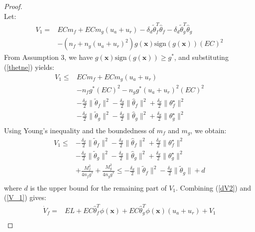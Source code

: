 \documentclass[preprint,12pt]{elsarticle}
\begin{document}
\begin{proof}
\begin{equation}
\end{equation}
Let:
\begin{equation}
    \begin{aligned}
        V_1 = &  EC m_f + EC m_g (u_a + u_r) - \delta_d \tilde{\theta}^{T}_f \hat{\theta}_f - \delta_d \tilde{\theta}^{T}_g \hat{\theta}_g \\ 
        & -(n_f+n_g(u_a + u_r)^2)g(\mathbf{x})\mathrm{sign}(g(\mathbf{x})) (EC)^2\label{V_1}
    \end{aligned}
\end{equation}
From Assumption 3, we have \(g(\mathbf{x})\mathrm{sign}(g(\mathbf{x})) \geq g^*\), and substituting (\ref*{thetne}) yields:
\begin{equation}
    \begin{aligned}
        V_1 \leq &  EC m_f + EC m_g (u_a + u_r)    \\
        & -n_f g^*(EC)^2 - n_g g^* (u_a + u_r)^2(EC)^2\\
        & - \frac{\delta_d}{2}\|\tilde{\theta}_f\|^2-\frac{\delta_d}{2}\|\hat{\theta}_f\|^2+\frac{\delta_d}{2}\|\theta^\star_f\|^2 \\ 
        & - \frac{\delta_d}{2}\|\tilde{\theta}_g\|^2-\frac{\delta_d}{2}\|\hat{\theta}_g\|^2+\frac{\delta_d}{2}\|\theta^\star_g\|^2 \\ 
    \end{aligned}
\end{equation}
Using Young's inequality and the boundedness of \(m_f\) and \(m_g\), we obtain:
\begin{equation}
    \begin{aligned}
        V_1 \leq & - \frac{\delta_d}{2}\|\tilde{\theta}_f\|^2-\frac{\delta_d}{2}\|\hat{\theta}_f\|^2+\frac{\delta_d}{2}\|\theta^\star_f\|^2 \\ 
        & - \frac{\delta_d}{2}\|\tilde{\theta}_g\|^2-\frac{\delta_d}{2}\|\hat{\theta}_g\|^2+\frac{\delta_d}{2}\|\theta^\star_g\|^2 \\ 
        & + \frac{M_f^2}{4n_fg^*} + \frac{M_g^2}{4n_gg^*} \leq - \frac{\delta_d}{2}\|\tilde{\theta}_f\|^2 - \frac{\delta_d}{2}\|\tilde{\theta}_g\| + d \\
    \end{aligned}
\end{equation}
where \(d\) is the upper bound for the remaining part of \(V_1\). Combining (\ref*{dV2}) and (\ref{V_1}) gives:
\begin{equation}
    \begin{aligned}
        \dot{V}_f = & EL + EC \hat{\theta}^{T}_f \phi(\mathbf{x}) + EC \hat{\theta}^{T}_g \phi(\mathbf{x})(u_a + u_r) + V_1 \\

\end{aligned}
\end{equation}
\end{proof}
\end{document}
